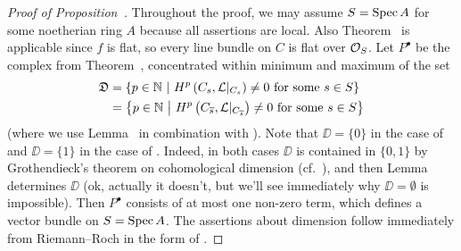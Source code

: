 \documentclass[a4paper,parskip=half,numbers=enddot, DIV=12]{scrreprt}
\begin{document}
\begin{proof}[Proof of Proposition~]
	Throughout the proof, we may assume $S=\operatorname{Spec} A$ for some noetherian ring $A$ because all assertions are local. Also Theorem~ is applicable since $f$ is flat, so every line bundle on $C$ is flat over $\mathcal{O}_S$. Let $P^\bullet$ be the complex from Theorem~, concentrated within minimum and maximum of the set
	\begin{align*}
		\mathfrak{D}&=\left\{p\in\mathbb{N}\ \middle|\  H^p\left(C_s,\mathcal{L}|_{C_s}\right)\neq 0\text{ for some }s\in S\right\}\\
		&=\left\{p\in\mathbb{N}\ \middle|\  H^p\left(C_{\overline{s}},\mathcal{L}|_{C_{\overline{s}}}\right)\neq 0\text{ for some }s\in S\right\}
	\end{align*}
	(where we use Lemma~ in combination with ). Note that $\DD=\{0\}$ in the case of  and $\DD=\{1\}$ in the case of . Indeed, in both cases $\DD$ is contained in $\{0,1\}$ by Grothendieck's theorem on cohomological dimension (cf.\ \cite[Proposition~1.4.1]{alggeo2}), and then Lemma~ determines $\DD$ (ok, actually it doesn't, but we'll see immediately why $\DD=\emptyset$ is impossible). Then $P^\bullet$ consists of at most one non-zero term, which defines a vector bundle on $S=\operatorname{Spec} A$. The assertions about dimension follow immediately from Riemann--Roch in the form of \cite[equation~(3.1.3)]{alggeo2}.
	

\end{proof}
\end{document}
